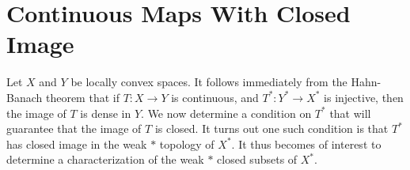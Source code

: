 \begin{comment}
\begin{example}
    The weak topology on $X$ is rarely equal to the original topology on $X$, except in degenerate circumstances. For instance, if we consider $e_n \in l_p$, for $1 < p < \infty$, then $\| e_n - e_m \| = 1$, so $e_n$ does not converge, yet if we consider any element $f \in l_q$ of the dual space, then $\langle f, e_n \rangle = f(n)$, which converges to zero as $n \to \infty$. Thus $e_n$ converges to zero in the weak topology. In $l_1$, $e_n$ does not converge at all, because the function $f(n) = (-1)^n$ is in $l_\infty$, and $\langle f, e_n \rangle = (-1)^n$ does not converge. It is important to note that the weak $*$ topology depends on the predual we are using. If we consider $l_1 = c_0^*$, then the $e_n$ converges to zero in the weak $*$ topology, yet if we consider $l_1$ as $c^*$, then the $e_n$ do not converge in the induced weak $*$ topology.

    The weak topology on a space is rarely first countable. If $A = \{ \sqrt{n} e_n : n \in \mathbf{N} \}$ is viewed as a subset of $l_2$, then 0 is contained in the weak closure of $A$, because if $\varepsilon > 0$ and we are given a finite set of sequences $\{ a_n^k \}_{n \in \mathbf{N}}$, for $1 \leq k \leq K$ and, for any $n$, there is $k_n$ such that $|a_n^{k_n}| \sqrt{n} > \varepsilon$, and if we consider the sum $\sum_k |a_n^k| \in l^2$, then
    \[ \sum_n \left|\sum_k |a_n^k| \right|^2 \geq \sum_n |a_n^{k_n}|^2 \geq \varepsilon \sum \frac{1}{n} = \infty \]
    so there must be an element of $A$ in each $U_{\varepsilon, \{ a_n^1 \}, \dots, \{ a_n^K \}}$, and hence $0$ is in the weak closure of $A$. However, 0 is not the weak limit of any sequence of elements in $A$, for
    \[ \sum_{n = 0}^\infty \frac{e_n}{n} \in l_2 \]
    and if we consider any sequence $\sqrt{n_i} e_{n_i}$ that converges weakly to zero, then we find that $(n_i)^{-1/2}$ converges to zero, hence $n_i \to \infty$. But then the sequence is not norm bounded, and hence cannot converge!
\end{example}
\end{comment}

\section{Continuous Maps With Closed Image}

Let $X$ and $Y$ be locally convex spaces. It follows immediately from the Hahn-Banach theorem that if $T: X \to Y$ is continuous, and $T^*: Y^* \to X^*$ is injective, then the image of $T$ is dense in $Y$. We now determine a condition on $T^*$ that will guarantee that the image of $T$ is closed. It turns out one such condition is that $T^*$ has closed image in the weak $*$ topology of $X^*$. It thus becomes of interest to determine a characterization of the weak $*$ closed subsets of $X^*$.

